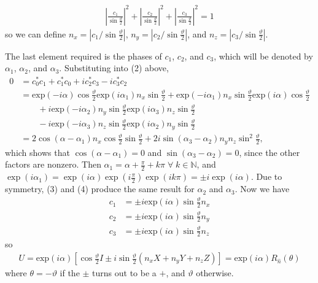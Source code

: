 \documentclass[a4paper,12pt]{article}
\begin{document}
\begin{enumerate}
\begin{enumerate}
\begin{align*}
                    \left| \frac{c_1}{\sin{\frac{\vartheta}{2}}} \right|^2 + \left| \frac{c_2}{\sin{\frac{\vartheta}{2}}} \right|^2 + \left| \frac{c_3}{\sin{\frac{\vartheta}{2}}} \right|^2 = 1
                \end{align*}
                so we can define $n_x = |c_1 / \sin{\frac{\vartheta}{2}}|$, $n_y = |c_2 / \sin{\frac{\vartheta}{2}}|$, and $n_z = |c_3 / \sin{\frac{\vartheta}{2}}|$. \par
                The last element required is the phases of $c_1$, $c_2$, and $c_3$, which will be denoted by $\alpha_1$, $\alpha_2$, and $\alpha_3$. Substituting into (2) above,
                \begin{align*}
                    0 &= c_0^* c_1 + c_1^* c_0 + i c_2^* c_3 - i c_3^* c_2 \\
                    &= \mbox{exp}(-i \alpha) \cos{\frac{\vartheta}{2}} \mbox{exp}(i \alpha_1) n_x \sin{\frac{\vartheta}{2}} + \mbox{exp}(-i \alpha_1) n_x \sin{\frac{\vartheta}{2}} \mbox{exp}(i \alpha) \cos{\frac{\vartheta}{2}} \\
                    &\qquad+ i\mbox{exp}(-i \alpha_2) n_y \sin{\frac{\vartheta}{2}} \mbox{exp}(i \alpha_3) n_z \sin{\frac{\vartheta}{2}} \\
                    &\qquad- i\mbox{exp}(-i \alpha_3) n_z \sin{\frac{\vartheta}{2}} \mbox{exp}(i \alpha_2) n_y \sin{\frac{\vartheta}{2}} \\
                    &= 2 \cos(\alpha - \alpha_1) n_x \cos{\frac{\vartheta}{2}} \sin{\frac{\vartheta}{2}} + 2i \sin(\alpha_3 - \alpha_2) n_y n_z \sin^2{\frac{\vartheta}{2}},
                \end{align*}
                which shows that $\cos(\alpha - \alpha_1) = 0$ and $\sin(\alpha_3 - \alpha_2) = 0$, since the other factors are nonzero. Then $\alpha_1 = \alpha + \frac{\pi}{2} + k\pi \; \forall \; k \in \mathbb{N}$, and $\exp(i \alpha_1) = \exp(i \alpha) \exp(i \frac{\pi}{2}) \exp(ik\pi) = \pm i \exp(i \alpha)$. Due to symmetry, (3) and (4) produce the same result for $\alpha_2$ and $\alpha_3$. Now we have
                \begin{align*}
                    c_1 &= \pm i \mbox{exp}(i \alpha) \sin\frac{\vartheta}{2} n_x \\
                    c_2 &= \pm i \mbox{exp}(i \alpha) \sin\frac{\vartheta}{2} n_y \\
                    c_3 &= \pm i \mbox{exp}(i \alpha) \sin\frac{\vartheta}{2} n_z
                \end{align*}
                so
                \begin{align*}
                    U = \mbox{exp}(i \alpha) \left[ \cos\frac{\vartheta}{2} I \pm i \sin\frac{\vartheta}{2} (n_x X + n_y Y + n_z Z) \right] = \mbox{exp}(i \alpha) R_{\hat{n}}(\theta)
                \end{align*}
                where $\theta = -\vartheta$ if the $\pm$ turns out to be a $+$, and $\vartheta$ otherwise.


\end{enumerate}
\end{enumerate}
\end{document}
